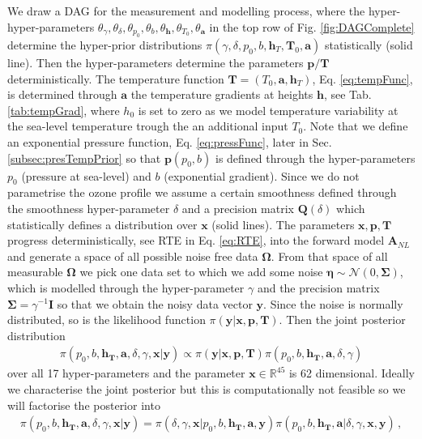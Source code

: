 We draw a DAG for the measurement and modelling process, where the hyper-hyper-parameters $\theta_{\gamma}, \theta_{\delta},\theta_{p_0},\theta_{b},\theta_{\bm{h}},\theta_{T_0},\theta_{\bm{a}}$ in the top row of Fig. \ref{fig:DAGComplete} determine the hyper-prior distributions $\pi(\gamma, \delta, p_0, b, \bm{h}_T, \bm{T}_0, \bm{a})$ statistically (solid line).
Then the hyper-parameters determine the parameters $\bm{p}/\bm{T}$ deterministically.
The temperature function $\bm{T} = (T_0,\bm{a}, \bm{h}_T)$, Eq. \ref{eq:tempFunc}, is determined through $\bm{a}$ the temperature gradients at heights $\bm{h}$, see Tab. \ref{tab:tempGrad}, where $h_0$ is set to zero as we model temperature variability at the sea-level temperature trough the an additional input $T_0$.
Note that we define an exponential pressure function, Eq. \ref{eq:pressFunc}, later in Sec. \ref{subsec:presTempPrior} so that $\bm{p}(p_0,b)$ is defined through the hyper-parameters $p_0$ (pressure at sea-level) and $b$ (exponential gradient).
Since we do not parametrise the ozone profile we assume a certain smoothness defined through the smoothness hyper-parameter $\delta$ and a precision matrix $\bm{Q}(\delta)$ which statistically defines a distribution over $\bm{x}$ (solid lines).
The parameters $\bm{x}, \bm{p},\bm{T}$ progress deterministically, see RTE in Eq. \ref{eq:RTE}, into the forward model $\bm{A}_{NL}$ and generate a space of all possible noise free data $\bm{\Omega}$.
From that space of all measurable $\bm{\Omega}$ we pick one data set to which we add some noise $\bm{\eta} \sim \mathcal{N}(0, \bm{\Sigma})$, which is modelled through the hyper-parameter $\gamma$ and the precision matrix $\bm{\Sigma} = \gamma^{-1} \bm{I}$ so that we obtain the noisy data vector $\bm{y}$.
Since the noise is normally distributed, so is the likelihood function $\pi(\bm{y} | \bm{x}, \bm{p}, \bm{T})$.
Then the joint posterior distribution
\begin{align}
	\pi(p_0,b,\bm{h_T},\bm{a},\delta, \gamma, \bm{x}| \bm{y}) \propto \pi(\bm{y} | \bm{x}, \bm{p}, \bm{T}) \pi(p_0,b,\bm{h_T},\bm{a},\delta, \gamma) 
\end{align}
over all 17 hyper-parameters and the parameter $\bm{x} \in \mathbb{R}^{45}$ is 62 dimensional.
Ideally we characterise the joint posterior but this is computationally not feasible so we will factorise the posterior into
\begin{align}
	\pi(p_0,b,\bm{h_T},\bm{a},\delta, \gamma, \bm{x}| \bm{y}) = \pi(\delta, \gamma, \bm{x}| p_0,b,\bm{h_T},\bm{a},\bm{y}) \pi(p_0,b,\bm{h_T},\bm{a}|\delta, \gamma, \bm{x}, \bm{y}) \, , 
\end{align}
